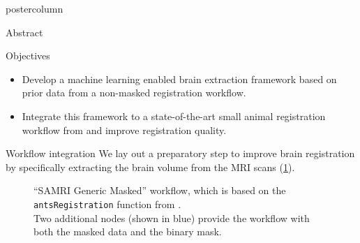     \begin{frame}
        \vspace{2cm}
        \begin{columns}
            \begin{column}{.42\textwidth}
                \begin{beamercolorbox}[center]{postercolumn}
                    \begin{minipage}{.98\textwidth}  %
                        \parbox[t][\columnheight]{\textwidth}{ %
                            \begin{myblock}{Abstract}
                                
                            \end{myblock}\vfill

                            \begin{myblock}{Objectives}
                                \begin{itemize}
                                    \item Develop a machine learning enabled brain extraction framework based on prior data from a non-masked registration workflow.
                                    \item Integrate this framework to a state-of-the-art small animal registration workflow from \cite{irsabi} and improve registration quality.
                                \end{itemize}
                            \end{myblock}

                            \begin{myblock}{Workflow integration}
                                We lay out a preparatory step to improve brain registration by specifically extracting the brain volume from the MRI scans (\cref{masked_worklfow_graph}).
                                \vspace{-1.4em}
                                \begin{figure}
                                    \centering
                                    \vspace{-2.9em}
                                    \caption{
                                        “SAMRI Generic Masked” workflow, which is based on the \textcolor{mg}{\texttt{antsRegistration}} function from \cite{irsabi}.\\
                                        Two additional nodes (shown in blue) provide the workflow with both the masked data and the binary mask.
                                    }
                                    \label{masked_worklfow_graph}
                                \end{figure}


\end{myblock}}
\end{minipage}
\end{beamercolorbox}
\end{column}
\end{columns}
\end{frame}
